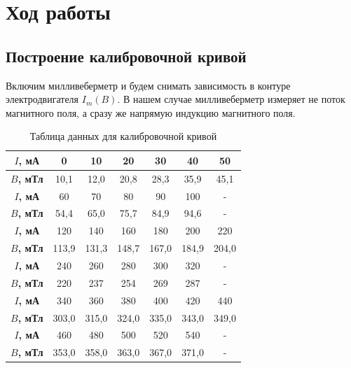 \section{Ход работы}

\subsection{Построение калибровочной кривой}

Включим милливеберметр и будем снимать зависимость в контуре электродвигателя $I_m(B)$. В нашем случае милливеберметр измеряет не поток магнитного поля, а сразу же напрямую индукцию магнитного поля.

\begin{table}[h!]
    \centering
    \begin{tabular}{|c|c|c|c|c|c|c|}
        \hline
        \textbf{$I$, мА}  & 0         & 10    & 20    & 30    & 40    & 50      \\ \hline
        \textbf{$B$, мТл} & 10,1      & 12,0  & 20,8  & 28,3  & 35,9  & 45,1    \\ \hline

        \textbf{$I$, мА}  & 60        & 70    & 80    & 90    & 100   & -       \\ \hline
        \textbf{$B$, мТл} & 54,4      & 65,0  & 75,7  & 84,9  & 94,6  & -       \\ \hline

        \textbf{$I$, мА}  & 120       & 140   & 160   & 180   & 200   & 220     \\ \hline
        \textbf{$B$, мТл} & 113,9     & 131,3 & 148,7 & 167,0 & 184,9 & 204,0   \\ \hline

        \textbf{$I$, мА}  & 240       & 260   & 280   & 300   & 320   & -       \\ \hline
        \textbf{$B$, мТл} & 220       & 237   & 254   & 269   & 287   & -       \\ \hline

        \textbf{$I$, мА}  & 340       & 360   & 380   & 400   & 420   & 440     \\ \hline
        \textbf{$B$, мТл} & 303,0     & 315,0 & 324,0 & 335,0 & 343,0 & 349,0   \\ \hline


        \textbf{$I$, мА}  & 460       & 480   & 500   & 520   & 540    & -      \\ \hline
        \textbf{$B$, мТл} & 353,0     & 358,0 & 363,0 & 367,0 & 371,0  & -      \\ \hline
    \end{tabular}
    \caption{Таблица данных для калибровочной кривой}
\end{table}

